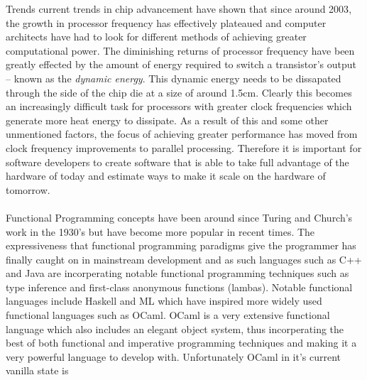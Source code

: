 \documentclass[12pt,twoside,notitlepage]{report}
\begin{document}
%
%
%
Trends current trends in chip advancement have shown that since around 2003\cite{hennessy2012}, the growth in processor frequency has effectively plateaued and computer architects have had to look for different methods of achieving
greater computational power. The diminishing returns of processor frequency have been greatly effected by the amount of energy required to switch a transistor's output -- known as the {\em dynamic energy}. This dynamic energy needs to
be dissapated through the side of the chip die at a size of around 1.5cm. Clearly this becomes an increasingly difficult task for processors with greater clock frequencies which generate more heat energy to dissipate. As a result of
this and some other unmentioned factors, the focus of achieving greater performance has moved from clock frequency improvements to parallel processing. Therefore it is important for software developers to create software that is
able to take full advantage of the hardware of today and estimate ways to make it scale on the hardware of tomorrow.
\\
\\
%
%
Functional Programming concepts have been around since Turing and Church's work in the 1930's\cite{scott2009} but have become more popular in recent times. The expressiveness that functional programming paradigms give the programmer
has finally caught on in mainstream development and as such languages such as C++ and Java are incorperating notable functional programming techniques such as type inference\cite{web:autokeyword} and first-class anonymous functions
(lambas)\cite{web:javalambda}. Notable functional languages include Haskell and ML which have inspired more widely used functional languages such as OCaml\cite{madhavapeddy2013}. OCaml is a very extensive functional language which
also includes an elegant object system, thus incorperating the best of both functional and imperative programming techniques and making it a very powerful language to develop with. Unfortunately OCaml in it's current vanilla state is
\end{document}
